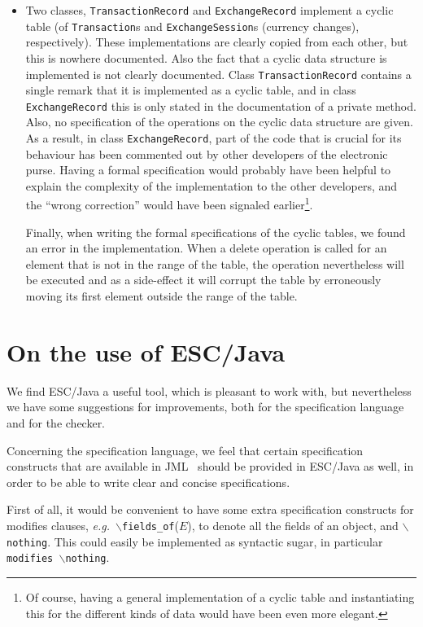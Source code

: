 \documentclass[a4paper]{llncs}
\newcommand{\noth}{\(\backslash\)\texttt{nothing}}
\newcommand{\fieldsof}{\(\backslash\)\texttt{fields\_of}}
\begin{document}
\begin{itemize}
\item Two classes, \texttt{TransactionRecord} and
\texttt{ExchangeRecord} implement a cyclic table (of
\texttt{Transaction}s and
\texttt{ExchangeSession}s (currency changes),
respectively).  These implementations are clearly copied from each
other, but this is nowhere documented. Also the fact that a
cyclic data structure is implemented is not clearly documented. Class
\texttt{TransactionRecord} contains a single remark that it is
implemented as a cyclic table, and in class
\texttt{Exchange\-Record} this is only stated in the documentation of a
private method. Also, no specification of the operations on the cyclic
data structure are given.
As a result, in class \texttt{ExchangeRecord}, part of the code that
is crucial for its behaviour has been commented out by other
developers of the electronic purse. Having a formal specification
would probably have been helpful to explain the complexity of the
implementation to the other developers, and the ``wrong correction''
would have been signaled earlier\footnote{Of course, having a general 
implementation of a cyclic table and instantiating this for the
different kinds of data would have been even more elegant.}.

Finally, when writing the formal specifications of the cyclic tables,
we found an error in the implementation. When a delete operation is
called for an element that is not in the range of the table, the
operation nevertheless will be executed and as a side-effect it will
corrupt the table by erroneously moving its first element outside the
range of the table.
\end{itemize}

\section{On the use of ESC/Java}
\label{SectESC}
We find ESC/Java a useful tool, which is pleasant to work with, but
nevertheless we have some suggestions for improvements, both for the
specification language and for the checker.

Concerning the specification language, we feel that certain
specification constructs that are available in JML~\cite{LeavensBR00}
should be provided in ESC/Java as well, in order to be able to write
clear and concise specifications. 

First of all, it would be convenient to have some extra specification
constructs for modifies clauses, \emph{e.g.}~\fieldsof(\(E\)), to denote all
the fields of an object, and \noth. This could easily be implemented
as syntactic sugar, in particular \texttt{modifies \noth}.
\end{document}
